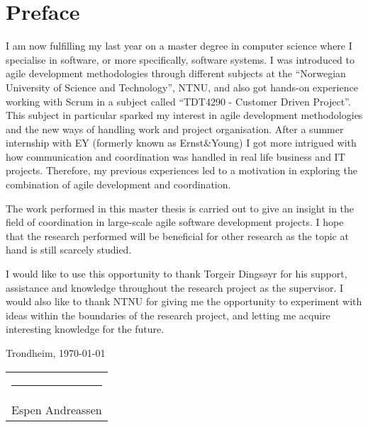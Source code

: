 \chapter*{Preface}

I am now fulfilling my last year on a master degree in computer science where I specialise in software, or more specifically, software systems. I was introduced to agile development methodologies through different subjects at the ``Norwegian University of Science and Technology'', NTNU, and also got hands-on experience working with Scrum in a subject called ``TDT4290 - Customer Driven Project''. This subject in particular sparked my interest in agile development methodologies and the new ways of handling work and project organisation. After a summer internship with EY (formerly known as Ernst\&Young) I got more intrigued with how communication and coordination was handled in real life business and IT projects. Therefore, my previous experiences led to a motivation in exploring the combination of agile development and coordination.

The work performed in this master thesis is carried out to give an insight in the field of coordination in large-scale agile software development projects. I hope that the research performed will be beneficial for other research as the topic at hand is still scarcely studied.

I would like to use this opportunity to thank Torgeir Dingsøyr for his support, assistance and knowledge throughout the research project as the supervisor. I would also like to thank NTNU for giving me the opportunity to experiment with ideas within the boundaries of the research project, and letting me acquire interesting knowledge for the future.

\vspace{1.5cm}

Trondheim, \today

\newcommand{\singleSignature}[1]{
\vspace{0.5cm}


\noindent


    \vspace{0.5cm}

    \begin{tabular}{l}
    \rule{6cm}{1pt}\\
    #1
    \end{tabular}

\vspace{1cm}
}

\singleSignature{Espen Andreassen}